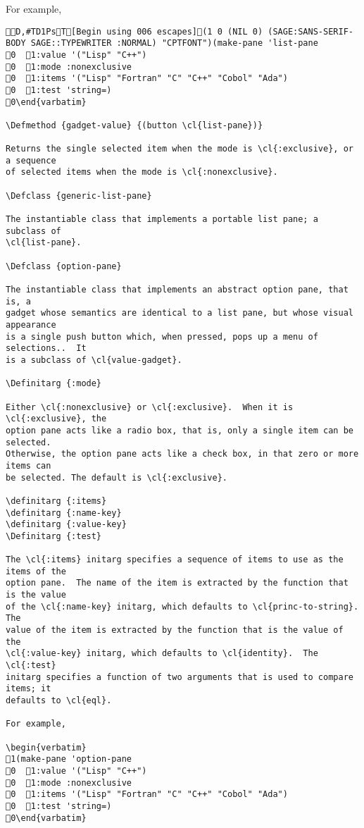 For example,

\begin{verbatim}
D,#TD1PsT[Begin using 006 escapes](1 0 (NIL 0) (SAGE:SANS-SERIF-BODY SAGE::TYPEWRITER :NORMAL) "CPTFONT")(make-pane 'list-pane
0  1:value '("Lisp" "C++")
0  1:mode :nonexclusive
0  1:items '("Lisp" "Fortran" "C" "C++" "Cobol" "Ada")
0  1:test 'string=)
0\end{varbatim}

\Defmethod {gadget-value} {(button \cl{list-pane})}

Returns the single selected item when the mode is \cl{:exclusive}, or a sequence
of selected items when the mode is \cl{:nonexclusive}.

\Defclass {generic-list-pane}

The instantiable class that implements a portable list pane; a subclass of
\cl{list-pane}.

\Defclass {option-pane}

The instantiable class that implements an abstract option pane, that is, a
gadget whose semantics are identical to a list pane, but whose visual appearance
is a single push button which, when pressed, pops up a menu of selections..  It
is a subclass of \cl{value-gadget}.

\Definitarg {:mode}

Either \cl{:nonexclusive} or \cl{:exclusive}.  When it is \cl{:exclusive}, the
option pane acts like a radio box, that is, only a single item can be selected.
Otherwise, the option pane acts like a check box, in that zero or more items can
be selected. The default is \cl{:exclusive}.

\definitarg {:items}
\definitarg {:name-key}
\definitarg {:value-key}
\Definitarg {:test}

The \cl{:items} initarg specifies a sequence of items to use as the items of the
option pane.  The name of the item is extracted by the function that is the value
of the \cl{:name-key} initarg, which defaults to \cl{princ-to-string}.  The
value of the item is extracted by the function that is the value of the
\cl{:value-key} initarg, which defaults to \cl{identity}.  The \cl{:test}
initarg specifies a function of two arguments that is used to compare items; it
defaults to \cl{eql}.

For example,

\begin{verbatim}
1(make-pane 'option-pane
0  1:value '("Lisp" "C++")
0  1:mode :nonexclusive
0  1:items '("Lisp" "Fortran" "C" "C++" "Cobol" "Ada")
0  1:test 'string=)
0\end{varbatim}


\end{verbatim}
